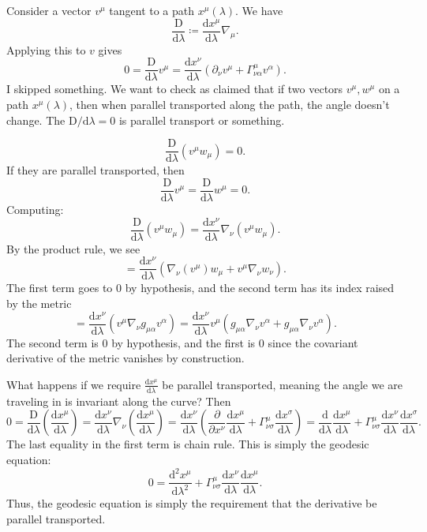 
Consider a vector $v^\mu $ tangent to a path $x^\mu (\lambda )$. We have
\[
	\frac{\mathrm{D} }{\mathrm{d} \lambda } \coloneqq \frac{\mathrm{d}x^\mu }{\mathrm{d}\lambda } \nabla _\mu 
.\]
Applying this to $v$ gives
\[
	0=\frac{\mathrm{D} }{\mathrm{d} \lambda } v^\mu =\frac{\mathrm{d}x^\nu }{\mathrm{d}\lambda } \left( \partial _\nu v^\mu +\Gamma _{\nu \alpha } ^\mu v^\alpha  \right) 
.\]
I skipped something. We want to check as claimed that if two vectors $v^\mu ,w^\mu $ on a path $x^\mu (\lambda )$, then when parallel transported along the path, the angle doesn't change. The $\mathrm{D} /\mathrm{d} \lambda =0$ is parallel transport or something.

\[
	\frac{\mathrm{D} }{\mathrm{d} \lambda} \left( v^\mu w_\mu  \right) =0
.\]
If they are parallel transported, then
\[
	\frac{\mathrm{D} }{\mathrm{d} \lambda } v^\mu =\frac{\mathrm{D} }{\mathrm{d} \lambda } w^\mu =0
.\]
Computing:
\[
	\frac{\mathrm{D} }{\mathrm{d} \lambda } (v^\mu w_\mu )=\frac{\mathrm{d}x^\nu }{\mathrm{d}\lambda } \nabla_\nu (v^\mu w_\mu )
.\]
By the product rule, we see
\[
	=\frac{\mathrm{d}x^\nu }{\mathrm{d}\lambda } \left( \nabla _\nu (v^\mu )w_\mu +v^\mu \nabla _\nu w_\nu  \right) 
.\]
The first term goes to 0 by hypothesis, and the second term has its index raised by the metric
\[
	=\frac{\mathrm{d}x^\nu }{\mathrm{d}\lambda } (v^\mu \nabla_\nu g_{\mu \alpha } v^\alpha )=\frac{\mathrm{d}x^\nu }{\mathrm{d}\lambda } v^\mu \left( g_{\mu \alpha } \nabla _\nu v^\alpha +g_{\mu \alpha } \nabla _\nu v^\alpha  \right) 
.\]
The second term is 0 by hypothesis, and the first is 0 since the covariant derivative of the metric vanishes by construction.

What happens if we require $\frac{\mathrm{d}x^\mu }{\mathrm{d}\lambda } $ be parallel transported, meaning the angle we are traveling in is invariant along the curve? Then
\[
	0=\frac{\mathrm{D} }{\mathrm{d} \lambda } \left( \frac{\mathrm{d}x^\mu }{\mathrm{d}\lambda }  \right) =\frac{\mathrm{d}x^\nu }{\mathrm{d}\lambda } \nabla _\nu \left( \frac{\mathrm{d}x^\mu }{\mathrm{d}\lambda }  \right) =\frac{\mathrm{d}x^\nu }{\mathrm{d}\lambda } \left( \frac{\partial }{\partial x^\nu } \frac{\mathrm{d}x^\mu }{\mathrm{d}\lambda } +\Gamma_{\nu \sigma } ^\mu \frac{\mathrm{d}x^\sigma }{\mathrm{d}\lambda }  \right) =\frac{\mathrm{d}}{\mathrm{d}\lambda } \frac{\mathrm{d}x^\mu }{\mathrm{d}\lambda } +\Gamma ^\mu _{\nu \sigma } \frac{\mathrm{d}x^\nu }{\mathrm{d}\lambda } \frac{\mathrm{d}x^\sigma }{\mathrm{d}\lambda } 
.\]
The last equality in the first term is chain rule. This is simply the geodesic equation:
\[
	0=\frac{\mathrm{d}^2x^\mu }{\mathrm{d}\lambda ^2} +\Gamma _{\nu \sigma } ^\mu \frac{\mathrm{d}x^\nu }{\mathrm{d}\lambda } \frac{\mathrm{d}x^\mu }{\mathrm{d}\lambda } 
.\]
Thus, the geodesic equation is simply the requirement that the derivative be parallel transported.


